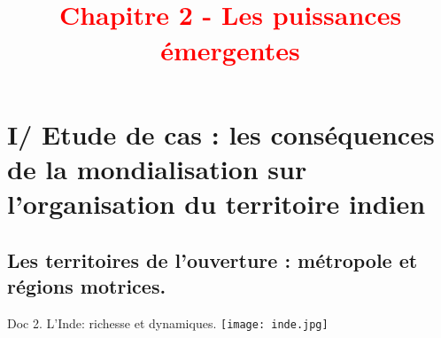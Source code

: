\documentclass{beamer}
\title{{\textcolor{red}{ %
      \\Chapitre 2 - Les puissances émergentes}}}
\begin{document}
 
\begin{frame}
\titlepage %
\end{frame}

\begin{frame}
\tableofcontents
\end{frame}



\section{I/ Etude de cas : les conséquences de la mondialisation sur l'organisation du territoire indien}


\subsection{Les territoires de l'ouverture : métropole et régions motrices.}
\begin{frame}
\begin{beamerboxesrounded}[scheme=blocimage]{Doc 2. L'Inde: richesse et dynamiques.} 
\texttt{[image: inde.jpg]}
\end{beamerboxesrounded}
\end{frame}
\end{document}
